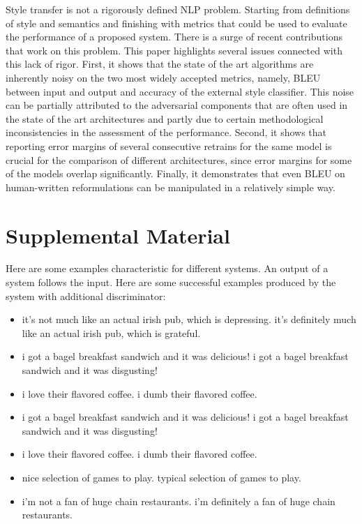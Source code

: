 \documentclass[11pt,a4paper]{article}
\begin{document}
Style transfer is not a rigorously defined NLP problem. Starting from definitions of style and semantics and finishing with metrics that could be used to evaluate the performance of a proposed system. There is a surge of recent contributions that work on this problem. This paper highlights several issues connected with this lack of rigor. First, it shows that the state of the art algorithms are inherently noisy on the two most widely accepted metrics, namely, BLEU between input and output and accuracy of the external style classifier. This noise can be partially attributed to the adversarial components that are often used in the state of the art architectures and partly due to certain methodological inconsistencies in the assessment of the performance. Second, it shows that reporting error margins of several consecutive retrains for the same model is crucial for the comparison of different architectures, since error margins for some of the models overlap significantly. Finally, it demonstrates that even BLEU on human-written reformulations can be manipulated in a relatively simple way. 






\appendix

\section{Supplemental Material}
\label{sec:appendix}
Here are some examples characteristic for different systems. An output of a system follows the input. Here are some successful examples produced by the system with additional discriminator:

\begin{itemize}
    \item it's not much like an actual irish pub, which is depressing.  it's definitely much like an actual irish pub, which is grateful.
    \item i got a bagel breakfast sandwich and it was delicious!  i got a bagel breakfast sandwich and it was disgusting!
    \item i love their flavored coffee.  i dumb their flavored coffee.
    \item i got a bagel breakfast sandwich and it was delicious!   i got a bagel breakfast sandwich and it was disgusting!
    \item i love their flavored coffee.  i dumb their flavored coffee.
    \item nice selection of games to play.  typical selection of games to play.
    \item i'm not a fan of huge chain restaurants.  i'm definitely a fan of huge chain restaurants.
\end{itemize}
\end{document}
